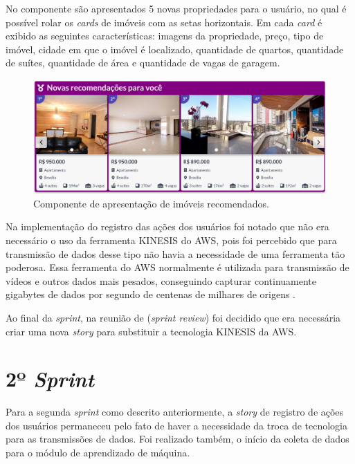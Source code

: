 No componente são apresentados 5 novas propriedades para o usuário, no qual é possível rolar os \textit{cards} de imóveis com as setas horizontais. Em cada \textit{card} é exibido as seguintes características: imagens da propriedade, preço, tipo de imóvel, cidade em que o imóvel é localizado, quantidade de quartos, quantidade de suítes, quantidade de área e quantidade de vagas de garagem.

\begin{figure}[H]
    \centering
    \includegraphics[scale=0.42]{figuras/desenvolvimento/componente_ml.png}
    \caption[Componente de apresentação de imóveis recomendados]{Componente de apresentação de imóveis recomendados.}
    \label{fig:componente_ml}
\end{figure}

Na implementação do registro das ações dos usuários foi notado que não era necessário o uso da ferramenta KINESIS do AWS, pois foi percebido que para transmissão de dados desse tipo não havia a necessidade de uma ferramenta tão poderosa. Essa ferramenta do AWS normalmente é utilizada para transmissão de vídeos e outros dados mais pesados, conseguindo capturar continuamente gigabytes de dados por segundo de centenas de milhares de origens \cite{KINESIS:2019}.

Ao final da \textit{sprint}, na reunião de (\textit{sprint review}) foi decidido que era necessária criar uma nova \textit{story} para substituir a tecnologia KINESIS da AWS.


\section{2º \textit{Sprint}}

Para a segunda \textit{sprint} como descrito anteriormente, a \textit{story} de registro de ações dos usuários permaneceu pelo fato de haver a necessidade da troca de tecnologia para as transmissões de dados. Foi realizado também, o início da coleta de dados para o módulo de aprendizado de máquina.

